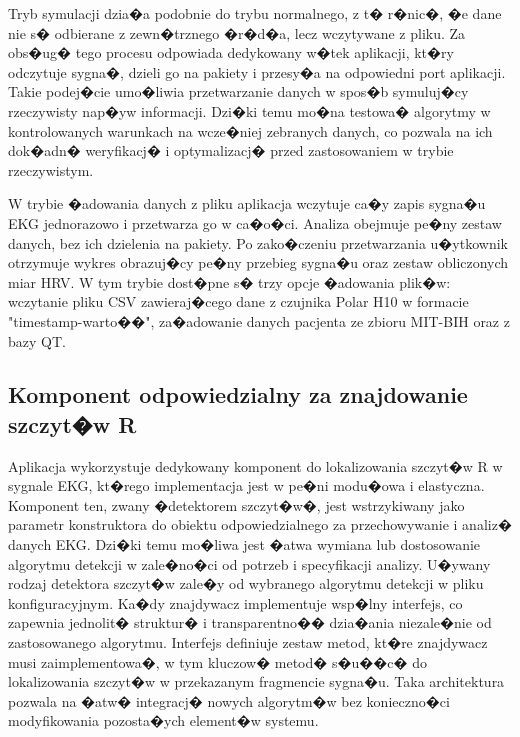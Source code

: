 Tryb symulacji dzia�a podobnie do trybu normalnego, z t� r�nic�, �e dane nie s�
odbierane z zewn�trznego �r�d�a, lecz wczytywane z pliku. Za obs�ug� tego
procesu odpowiada dedykowany w�tek aplikacji, kt�ry odczytuje sygna�, dzieli go
na pakiety i przesy�a na odpowiedni port aplikacji. Takie podej�cie umo�liwia
przetwarzanie danych w spos�b symuluj�cy rzeczywisty nap�yw informacji. Dzi�ki
temu mo�na testowa� algorytmy w kontrolowanych warunkach na wcze�niej zebranych
danych, co pozwala na ich dok�adn� weryfikacj� i optymalizacj� przed
zastosowaniem w trybie rzeczywistym.

W trybie �adowania danych z pliku aplikacja wczytuje ca�y zapis sygna�u EKG
jednorazowo i przetwarza go w ca�o�ci. Analiza obejmuje pe�ny zestaw danych,
bez ich dzielenia na pakiety. Po zako�czeniu przetwarzania u�ytkownik otrzymuje
wykres obrazuj�cy pe�ny przebieg sygna�u oraz zestaw obliczonych miar HRV. W
tym trybie dost�pne s� trzy opcje �adowania plik�w: wczytanie pliku CSV
zawieraj�cego dane z czujnika Polar H10 w formacie "timestamp-warto��",
za�adowanie danych pacjenta ze zbioru MIT-BIH oraz z bazy QT.

\subsection{Komponent odpowiedzialny za znajdowanie szczyt�w R}
Aplikacja wykorzystuje dedykowany komponent do lokalizowania szczyt�w R w
sygnale EKG, kt�rego implementacja jest w pe�ni modu�owa i elastyczna.
Komponent ten, zwany �detektorem szczyt�w�, jest wstrzykiwany jako parametr
konstruktora do obiektu odpowiedzialnego za przechowywanie i analiz� danych
EKG. Dzi�ki temu mo�liwa jest �atwa wymiana lub dostosowanie algorytmu detekcji
w zale�no�ci od potrzeb i specyfikacji analizy. U�ywany rodzaj detektora
szczyt�w zale�y od wybranego algorytmu detekcji w pliku konfiguracyjnym. Ka�dy
znajdywacz implementuje wsp�lny interfejs, co zapewnia jednolit� struktur� i
transparentno�� dzia�ania niezale�nie od zastosowanego algorytmu. Interfejs
definiuje zestaw metod, kt�re znajdywacz musi zaimplementowa�, w tym kluczow�
metod� s�u��c� do lokalizowania szczyt�w w przekazanym fragmencie sygna�u. Taka
architektura pozwala na �atw� integracj� nowych algorytm�w bez konieczno�ci
modyfikowania pozosta�ych element�w systemu.

